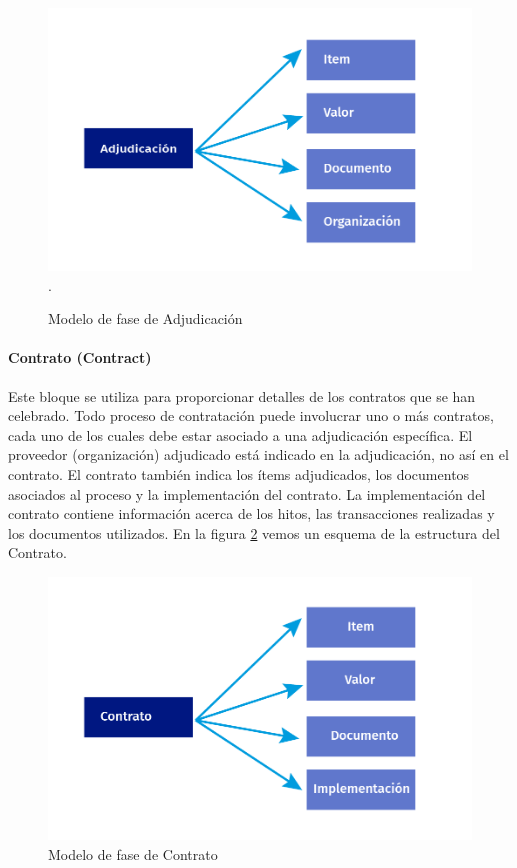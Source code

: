 \begin{figure}[h!]
    \centering
    \includegraphics[width=150mm]{figuras/Diagramas_Adjudicacion.png}.
    \caption{Modelo de fase de Adjudicación}
    \label{img:Fase de Adjudiacion}
\end{figure}


\paragraph{Contrato (Contract)}
Este bloque se utiliza para proporcionar detalles de los contratos que se han celebrado. Todo proceso de contratación puede involucrar uno o más contratos, cada uno de los cuales debe estar asociado a una adjudicación específica. El proveedor (organización) adjudicado está indicado en la adjudicación, no así en el contrato. El contrato también indica los ítems adjudicados, los documentos asociados al proceso y la implementación del contrato. La implementación del contrato contiene información acerca de los hitos, las transacciones realizadas y los documentos utilizados. En la figura \ref{img:Fase de Contrato} vemos un esquema de la estructura del Contrato.

\begin{figure}[h!]
    \centering
    \includegraphics[width=150mm]{figuras/Diagramas_Contrato.png}
    \caption{Modelo de fase de Contrato}
    \label{img:Fase de Contrato}
\end{figure}

